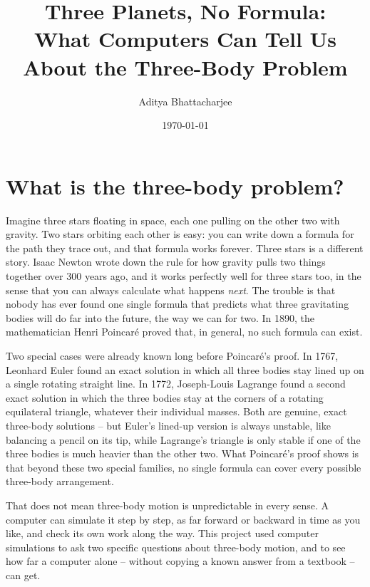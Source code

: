 \documentclass[11pt]{article}
\title{Three Planets, No Formula:\\
What Computers Can Tell Us About the Three-Body Problem}
\author{Aditya Bhattacharjee}
\date{\today}
\begin{document}
\maketitle

\section{What is the three-body problem?}

Imagine three stars floating in space, each one pulling on the other two
with gravity. Two stars orbiting each other is easy: you can write down a
formula for the path they trace out, and that formula works forever. Three
stars is a different story. Isaac Newton wrote down the rule for how
gravity pulls two things together over 300 years ago, and it works
perfectly well for three stars too, in the sense that you can always
calculate what happens \emph{next}. The trouble is that nobody has ever
found one single formula that predicts what three gravitating bodies will
do far into the future, the way we can for two. In 1890, the
mathematician Henri Poincar\'e proved that, in general, no such formula
can exist.

Two special cases were already known long before Poincar\'e's proof. In
1767, Leonhard Euler found an exact solution in which all three bodies
stay lined up on a single rotating straight line. In 1772, Joseph-Louis
Lagrange found a second exact solution in which the three bodies stay at
the corners of a rotating equilateral triangle, whatever their individual
masses. Both are genuine, exact three-body solutions -- but Euler's
lined-up version is always unstable, like balancing a pencil on its tip,
while Lagrange's triangle is only stable if one of the three bodies is
much heavier than the other two. What Poincar\'e's proof shows is that
beyond these two special families, no single formula can cover every
possible three-body arrangement.

That does not mean three-body motion is unpredictable in every sense. A
computer can simulate it step by step, as far forward or backward in time
as you like, and check its own work along the way. This project used
computer simulations to ask two specific questions about three-body
motion, and to see how far a computer alone -- without copying a known
answer from a textbook -- can get.

\end{document}
